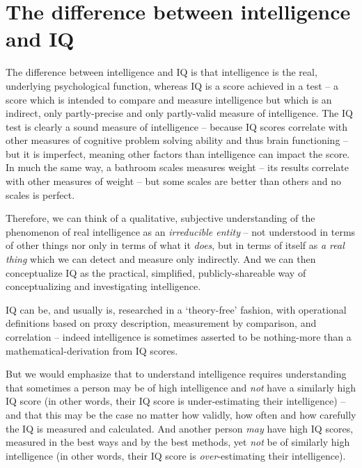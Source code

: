 \documentclass[
]{book}
\begin{document}
\hypertarget{the-difference-between-intelligence-and-iq}{%
\section{The difference between intelligence and IQ}\label{the-difference-between-intelligence-and-iq}}

The difference between intelligence and IQ is that intelligence is the real, underlying psychological function, whereas IQ is a score achieved in a test -- a score which is intended to compare and measure intelligence but which is an indirect, only partly-precise and only partly-valid measure of intelligence. The IQ test is clearly a sound measure of intelligence -- because IQ scores correlate with other measures of cognitive problem solving ability and thus brain functioning -- but it is imperfect, meaning other factors than intelligence can impact the score. In much the same way, a bathroom scales measures weight -- its results correlate with other measures of weight -- but some scales are better than others and no scales is perfect.

Therefore, we can think of a qualitative, subjective understanding of the phenomenon of real intelligence as an \emph{irreducible entity} -- not understood in terms of other things nor only in terms of what it \emph{does}, but in terms of itself as \emph{a real thing} which we can detect and measure only indirectly. And we can then conceptualize IQ as the practical, simplified, publicly-shareable way of conceptualizing and investigating intelligence.

IQ can be, and usually is, researched in a `theory-free' fashion, with operational definitions based on proxy description, measurement by comparison, and correlation -- indeed intelligence is sometimes asserted to be nothing-more than a mathematical-derivation from IQ scores.

But we would emphasize that to understand intelligence requires understanding that sometimes a person may be of high intelligence and \emph{not} have a similarly high IQ score (in other words, their IQ score is under-estimating their intelligence) -- and that this may be the case no matter how validly, how often and how carefully the IQ is measured and calculated. And another person \emph{may} have high IQ scores, measured in the best ways and by the best methods, yet \emph{not} be of similarly high intelligence (in other words, their IQ score is \emph{over}-estimating their intelligence).
\end{document}
